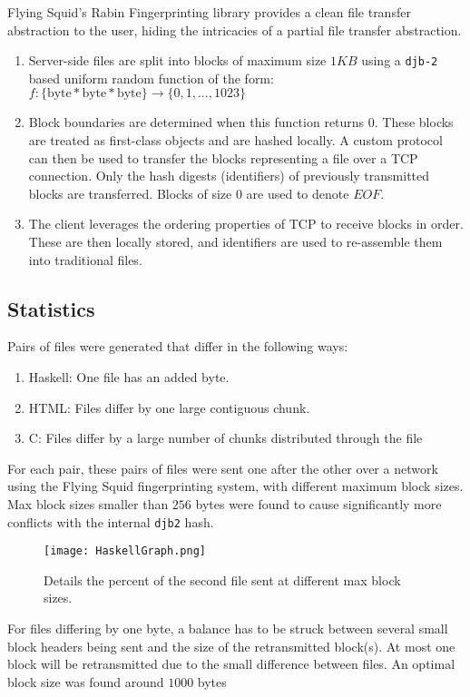 Flying Squid's Rabin Fingerprinting library provides a clean file transfer abstraction to the user, hiding the intricacies of a partial file transfer abstraction.

\begin{enumerate}

\item Server-side files are split into blocks of maximum size $1 KB$ using a \verb|djb-2|\cite{djb2} based uniform random function of the form: \\
$f: \{\text{byte} * \text{byte} * \text{byte} \} \rightarrow \{0, 1, ..., 1023\}$
 
\item Block boundaries are determined when this function returns 0. These blocks are treated as first-class objects and are hashed locally. A custom protocol can then be used to transfer the blocks representing a file over a TCP connection. Only the hash digests (identifiers) of previously transmitted blocks are transferred. Blocks of size 0 are used to denote $EOF$.

\item The client  leverages the ordering properties of TCP to receive blocks in order. These are then locally stored, and identifiers are used to re-assemble them into traditional files. 
\end{enumerate}

\subsection {Statistics}

Pairs of files were generated that differ in the following ways:

\begin{enumerate}
\item Haskell: One file has an added byte.
\item HTML: Files differ by one large contiguous chunk.
\item C: Files differ by a large number of chunks distributed through the file
\end{enumerate}

For each pair, these pairs of files were sent one after the other over a network using the Flying Squid fingerprinting system, with different maximum block sizes. Max block sizes 	smaller than $256$ bytes were found to cause significantly more conflicts with the internal \verb|djb2| hash. 


\begin{figure}[H] \centering
\texttt{[image: HaskellGraph.png]}
\caption{Details the percent of the second file sent at different max block sizes.}
\end{figure}
\noindent
For files differing by one byte, a balance has to be struck between several small block headers being sent and the size of the retransmitted block(s). At most one block will be retransmitted due to the small difference between files. An optimal block size was found around $1000$ bytes

